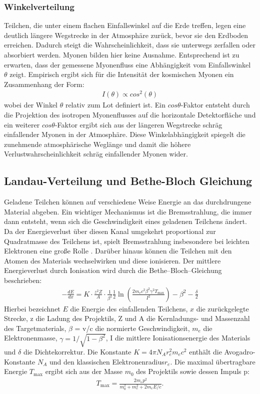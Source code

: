 \subsubsection{Winkelverteilung}
Teilchen, die unter einem flachen Einfallswinkel auf die Erde treffen, legen eine deutlich längere Wegstrecke in der Atmosphäre zurück, bevor sie den Erdboden erreichen. Dadurch steigt die Wahrscheinlichkeit, dass sie unterwegs zerfallen oder absorbiert werden. Myonen bilden hier keine Ausnahme. Entsprechend ist zu erwarten, dass der gemessene Myonenfluss eine Abhängigkeit vom Einfallswinkel $\theta$ zeigt.
Empirisch ergibt sich für die Intensität der kosmischen Myonen ein Zusammenhang der Form:
\begin{align*}
    I(\theta)\propto cos^2(\theta)
\end{align*}
wobei der Winkel $\theta$ relativ zum Lot definiert ist.
Ein $cos\theta$-Faktor entsteht durch die Projektion des isotropen Myonenflusses auf die horizontale Detektorfläche und ein weiterer  $cos\theta$-Faktor  ergibt sich aus der längeren Wegstrecke schräg einfallender Myonen in der Atmosphäre.  Diese Winkelabhängigkeit spiegelt die zunehmende atmosphärische Weglänge und damit die höhere Verlustwahrscheinlichkeit schräg einfallender Myonen wider.
\subsection{Landau-Verteilung und Bethe-Bloch Gleichung}
Geladene Teilchen können auf verschiedene Weise Energie an das durchdrungene Material abgeben. Ein wichtiger Mechanismus ist die Bremsstrahlung, die immer dann entsteht, wenn sich die Geschwindigkeit eines geladenen Teilchens ändert. Da der Energieverlust über diesen Kanal umgekehrt proportional zur Quadratmasse des Teilchens ist, spielt Bremsstrahlung insbesondere bei leichten Elektronen eine große Rolle \cite{Leo}.
Darüber hinaus können die Teilchen mit den Atomen des Materials wechselwirken und diese ionisieren. Der mittlere Energieverlust durch Ionisation wird durch die Bethe--Bloch--Gleichung beschrieben:
\begin{align*}
    -\frac{dE}{dx} = K \cdot \frac{z^2 Z}{A} \cdot \frac{1}{\beta^2}\frac{1}{2} \ln\left( \frac{2 m_e c^2 \beta^2 \gamma^2 T_{\text{max}}}{I^2} \right) - \beta^2 - \frac{\delta}{2} 
\end{align*}
Hierbei bezeichnet $E$ die Energie des einfallenden Teilchens, $x$ die zurückgelegte Strecke, z die Ladung des Projektils, Z und A die Kernladungs- und Massenzahl des Targetmaterials, $\beta$ = v/c die normierte Geschwindigkeit, $m_e$ die Elektronenmasse, $\gamma = 1/\sqrt{1-\beta^2}$, I die mittlere Ionisationsenergie des Materials und $\delta$ die Dichtekorrektur. 
Die Konstante $K = 4\pi N_A r_e^2 m_e c^2$ enthält die Avogadro-Konstante $N_A$ und den klassischen Elektronenradius$ r_e$. 
Die maximal übertragbare Energie $T_{\text{max}}$ ergibt sich aus der Masse $m_0$ des Projektils sowie dessen Impuls p:
\begin{align*}
    T_{\text{max}} = \frac{2 m_e p^2}{m_0^2 + m_e^2 + 2 m_e E/c}.
\end{align*}

